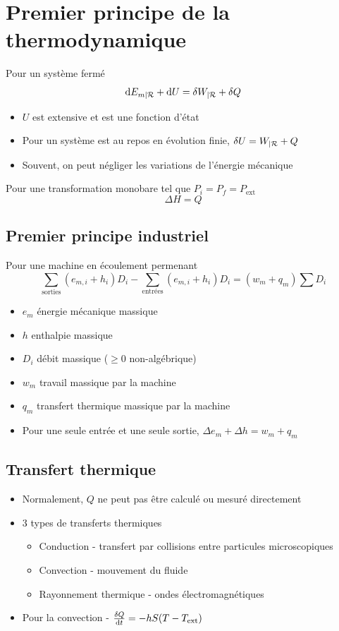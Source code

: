 \documentclass[openany]{book}
\begin{document}
\section{Premier principe de la thermodynamique}
Pour un système fermé
\[ \text{d} E_{m|\mathcal{R}} + \text{d} U = \delta W_{|\mathcal{R}} + \delta Q \]

\begin{itemize}
    \item $U$ est extensive et est une fonction d'état
    \item Pour un système est au repos en évolution finie, $\delta U = W_{|\mathcal{R}} + Q$
    \item Souvent, on peut négliger les variations de l'énergie mécanique
\end{itemize}

\noindent Pour une transformation monobare tel que $P_i = P_f = P_{\text{ext}}$
\[ \Delta H = Q \]

\subsection{Premier principe industriel}
Pour une machine en écoulement permenant 
\[ \sum_{\text{sorties}} (e_{m,i} + h_i)D_i - \sum_{\text{entrées}} (e_{m, i} + h_i)D_i = (w_m + q_m)\sum D_i \]

\begin{itemize}
    \item $e_m$ énergie mécanique massique
    \item $h$ enthalpie massique
    \item $D_i$ débit massique ($\geq 0$ non-algébrique)
    \item $w_m$ travail massique par la machine
    \item $q_m$ transfert thermique massique par la machine
    \item Pour une seule entrée et une seule sortie, $\Delta e_m + \Delta h = w_m + q_m$
\end{itemize}

\subsection{Transfert thermique}
\begin{itemize}
    \item Normalement, $Q$ ne peut pas être calculé ou mesuré directement
    \item 3 types de transferts thermiques
    \begin{itemize}
        \item Conduction - transfert par collisions entre particules microscopiques
        \item Convection - mouvement du fluide 
        \item Rayonnement thermique - ondes électromagnétiques
    \end{itemize}
    \item Pour la convection - $ \frac{\delta Q}{\text{d}t} = -hS(T - T_{\text{ext}}) $
\end{itemize}
\end{document}
